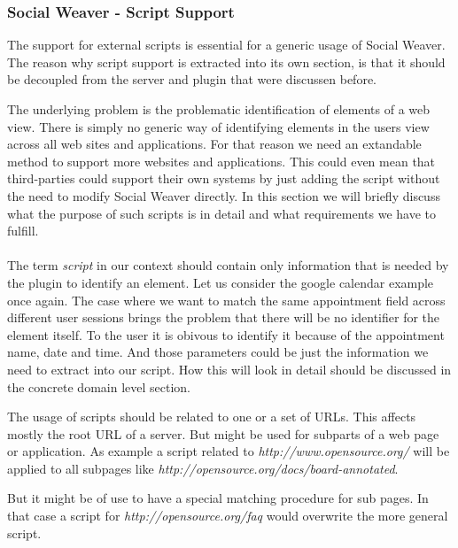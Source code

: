 
\subsubsection{Social Weaver - Script Support} \label{abstract-script-support-reqs}
The support for external scripts is essential for a generic usage of Social Weaver. The reason why script support is extracted into its own section, is that it should be decoupled from the server and plugin that were discussen before. 

The underlying problem is the problematic identification of elements of a web view. There is simply no generic way of identifying elements in the users view across all web sites and applications. For that reason we need an extandable method to support more websites and applications. This could even mean that third-parties could support their own systems by just adding the script without the need to modify Social Weaver directly. In this section we will briefly discuss what the purpose of such scripts is in detail and what requirements we have to fulfill. 
\\ \\
The term \textit{script} in our context should contain only information that is needed by the plugin to identify an element. Let us consider the google calendar example once again. The case where we want to match the same appointment field across different user sessions brings the problem that there will be no identifier for the element itself. To the user it is obivous to identify it because of the appointment name, date and time. And those parameters could be just the information we need to extract into our script. How this will look in detail should be discussed in the concrete domain level section. 

The usage of scripts should be related to one or a set of URLs. This affects mostly the root URL of a server. But might be used for subparts of a web page or application. As example a script related to \textit{http://www.opensource.org/} will be applied to all subpages like \textit{http://opensource.org/docs/board-annotated}. 

But it might be of use to have a special matching procedure for sub pages.  In that case a script for \textit{http://opensource.org/faq} would overwrite the more general script. 

